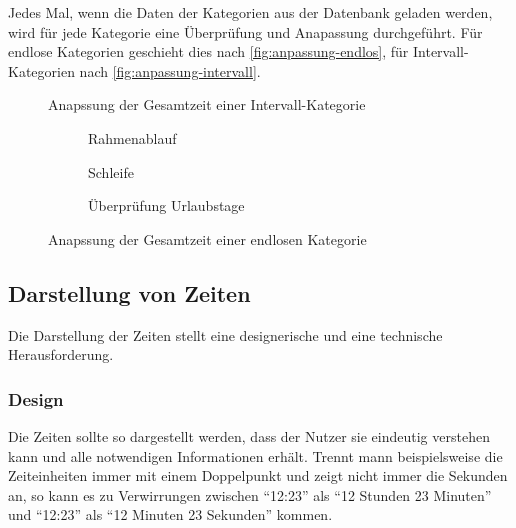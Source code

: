 Jedes Mal, wenn die Daten der Kategorien aus der Datenbank geladen werden,
wird für jede Kategorie eine Überprüfung und Anapassung durchgeführt.
Für endlose Kategorien geschieht dies nach \autoref{fig:anpassung-endlos},
für Intervall-Kategorien nach \autoref{fig:anpassung-intervall}.
\begin{figure}[ht!]
    \centering
    \resizebox{0.5\textwidth}{!}{
        
    }
	\caption{Anapssung der Gesamtzeit einer Intervall-Kategorie}
    \label{fig:anpassung-intervall}
\end{figure}

\begin{figure}
    \begin{subfigure}{0.5\textwidth}
        \resizebox{0.9\linewidth}{!}{
            
        }
		\caption{Rahmenablauf}
	\end{subfigure}
	\begin{subfigure}{0.5\textwidth}
        \resizebox{0.9\linewidth}{!}{
            
        }
		\caption{Schleife}
    \end{subfigure}
    \begin{subfigure}{\textwidth}
        \resizebox{\linewidth}{!}{
            
        }
		\caption{Überprüfung Urlaubstage}
	\end{subfigure}
	\caption{Anapssung der Gesamtzeit einer endlosen Kategorie}
	\label{fig:anpassung-endlos}
\end{figure}


\subsection{Darstellung von Zeiten}
Die Darstellung der Zeiten stellt eine designerische und eine technische Herausforderung.

\subsubsection{Design}
Die Zeiten sollte so dargestellt werden,
dass der Nutzer sie eindeutig verstehen kann und alle notwendigen Informationen erhält.
Trennt mann beispielsweise die Zeiteinheiten immer mit einem Doppelpunkt und zeigt nicht immer die Sekunden an,
so kann es zu Verwirrungen zwischen \enquote{12:23} als \enquote{12 Stunden 23 Minuten}
und \enquote{12:23} als \enquote{12 Minuten 23 Sekunden} kommen.

